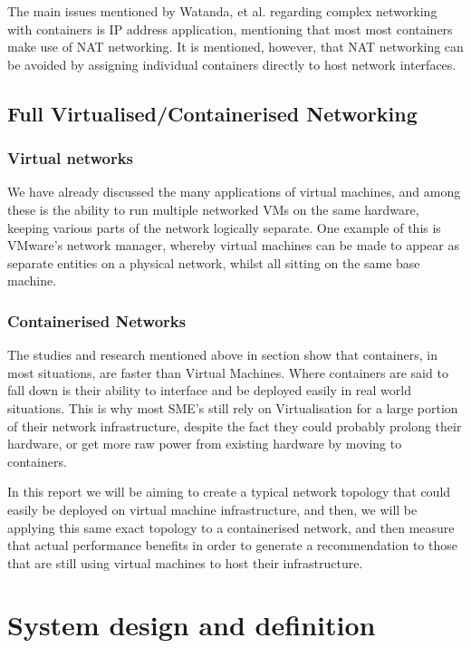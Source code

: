The main issues mentioned by Watanda, et al. regarding complex networking with containers is IP address application, mentioning that most most containers make use of NAT networking\citep[VIII. A.]{watanda19}. It is mentioned, however, that NAT networking can be avoided by assigning individual containers directly to host network interfaces\citep[VIII. A.]{watanda19}.

\section{Full Virtualised/Containerised Networking}
\subsection{Virtual networks}
We have already discussed the many applications of virtual machines, and among these is the ability to run multiple networked VMs on the same hardware, keeping various parts of the network logically separate. One example of this is VMware's network manager, whereby virtual machines can be made to appear as separate entities on a physical network\citep{VMwareNetChange}, whilst all sitting on the same base machine.

\subsection{Containerised Networks}
The studies and research mentioned above in section \label{ComparisonStudies} show that containers, in most situations, are faster than Virtual Machines. Where containers are said to fall down is their ability to interface and be deployed easily in real world situations. This is why most SME's still rely on Virtualisation for a large portion of their network infrastructure, despite the fact they could probably prolong their hardware, or get more raw power from existing hardware by moving to containers.

In this report we will be aiming to create a typical network topology that could easily be deployed on virtual machine infrastructure, and then, we will be applying this same exact topology to a containerised network, and then measure that actual performance benefits in order to generate a recommendation to those that are still using virtual machines to host their infrastructure.

\chapter{System design and definition}
\label{SystemDesignDefinition}

